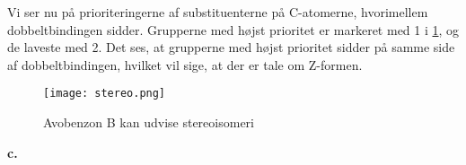 \documentclass{report}
\begin{document}
Vi ser nu på prioriteringerne af substituenterne på C-atomerne, hvorimellem dobbeltbindingen sidder.
Grupperne med højst prioritet er markeret med 1 i \cref{fig:stereo}, og de laveste med 2.
Det ses, at grupperne med højst prioritet sidder på samme side af dobbeltbindingen, hvilket vil sige, at der er tale om Z-formen.

\begin{figure}[H]
\begin{center}
  \texttt{[image: stereo.png]}
\end{center}
\caption{Avobenzon B kan udvise stereoisomeri}
\label{fig:stereo}
\end{figure}
\noindent \textbf{c.}
\end{document}
